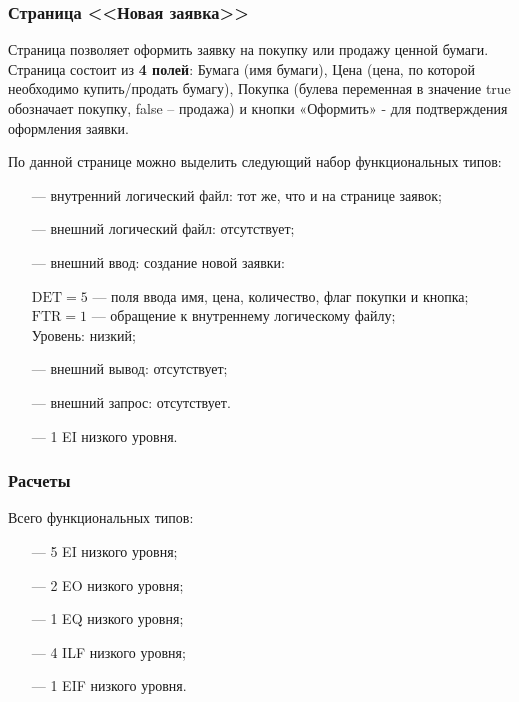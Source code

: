 \subsubsection{Страница <<Новая заявка>>}

Страница позволяет оформить заявку на покупку или продажу ценной бумаги. Страница состоит из \textbf{4 полей}: Бумага (имя бумаги), Цена (цена, по которой необходимо купить/продать бумагу), Покупка (булева переменная в значение true обозначает покупку, false – продажа) и кнопки «Оформить» - для подтверждения оформления заявки.

По данной странице можно выделить следующий набор функциональных типов:

\begin{itemize}
    \item[---] внутренний логический файл: тот же, что и на странице заявок;
    \item[---] внешний логический файл: отсутствует;
    \item[---] внешний ввод: создание новой заявки:

        $\text{DET} = 5$ --- поля ввода имя, цена, количество, флаг покупки и кнопка; \\
        $\text{FTR} = 1$ --- обращение к внутреннему логическому файлу;\\
        Уровень: низкий;
    
    \item[---] внешний вывод: отсутствует;
    \item[---] внешний запрос: отсутствует.
\end{itemize}

\begin{itemize}
    \item[---] 1 EI низкого уровня.
\end{itemize}

\subsubsection*{Расчеты}

Всего функциональных типов:

\begin{itemize}
    \item[---] 5 EI низкого уровня;
    \item[---] 2 EO низкого уровня;
    \item[---] 1 EQ низкого уровня;
    \item[---] 4 ILF низкого уровня;
    \item[---] 1 EIF низкого уровня.
\end{itemize}

